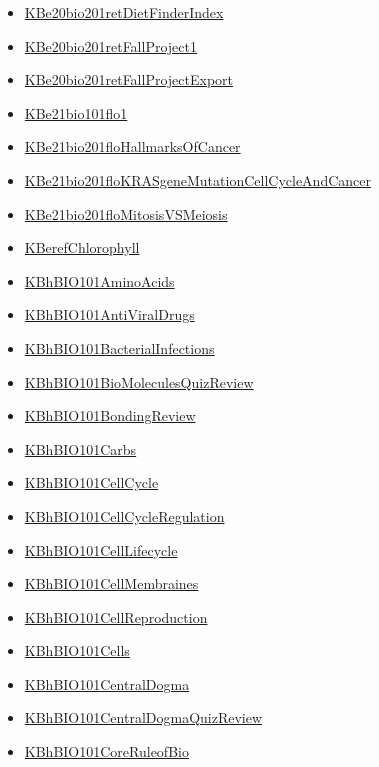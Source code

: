 \documentclass[11pt]{article}
\begin{document}
\begin{itemize}
\begin{itemize}
\item \href{bio101/KBe20bio201retDietFinderIndex.org}{KBe20bio201retDietFinderIndex}
\item \href{bio101/KBe20bio201retFallProject1.org}{KBe20bio201retFallProject1}
\item \href{bio101/KBe20bio201retFallProjectExport.org}{KBe20bio201retFallProjectExport}
\item \href{bio101/KBe21bio101flo1.org}{KBe21bio101flo1}
\item \href{bio101/KBe21bio201floHallmarksOfCancer.org}{KBe21bio201floHallmarksOfCancer}
\item \href{bio101/KBe21bio201floKRASgeneMutationCellCycleAndCancer.org}{KBe21bio201floKRASgeneMutationCellCycleAndCancer}
\item \href{bio101/KBe21bio201floMitosisVSMeiosis.org}{KBe21bio201floMitosisVSMeiosis}
\item \href{bio101/KBerefChlorophyll.org}{KBerefChlorophyll}
\item \href{bio101/KBhBIO101AminoAcids.org}{KBhBIO101AminoAcids}
\item \href{bio101/KBhBIO101AntiViralDrugs.org}{KBhBIO101AntiViralDrugs}
\item \href{bio101/KBhBIO101BacterialInfections.org}{KBhBIO101BacterialInfections}
\item \href{bio101/KBhBIO101BioMoleculesQuizReview.org}{KBhBIO101BioMoleculesQuizReview}
\item \href{bio101/KBhBIO101BondingReview.org}{KBhBIO101BondingReview}
\item \href{bio101/KBhBIO101Carbs.org}{KBhBIO101Carbs}
\item \href{bio101/KBhBIO101CellCycle.org}{KBhBIO101CellCycle}
\item \href{bio101/KBhBIO101CellCycleRegulation.org}{KBhBIO101CellCycleRegulation}
\item \href{bio101/KBhBIO101CellLifecycle.org}{KBhBIO101CellLifecycle}
\item \href{bio101/KBhBIO101CellMembraines.org}{KBhBIO101CellMembraines}
\item \href{bio101/KBhBIO101CellReproduction.org}{KBhBIO101CellReproduction}
\item \href{bio101/KBhBIO101Cells.org}{KBhBIO101Cells}
\item \href{bio101/KBhBIO101CentralDogma.org}{KBhBIO101CentralDogma}
\item \href{bio101/KBhBIO101CentralDogmaQuizReview.org}{KBhBIO101CentralDogmaQuizReview}
\item \href{bio101/KBhBIO101CoreRuleofBio.org}{KBhBIO101CoreRuleofBio}

\end{itemize}
\end{itemize}
\end{document}
